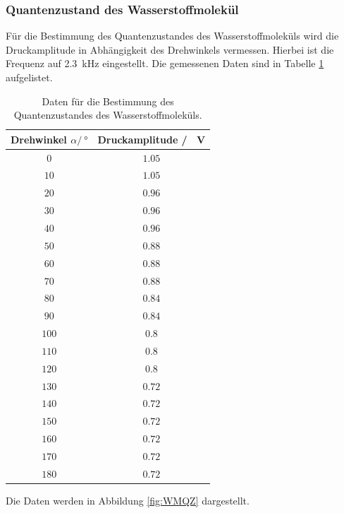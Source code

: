 \subsubsection{Quantenzustand des Wasserstoffmolekül}
Für die Bestimmung des Quantenzustandes des Wasserstoffmoleküls wird die Druckamplitude in Abhängigkeit des Drehwinkels 
vermessen. Hierbei ist die Frequenz auf \SI{2.3}{\kilo\hertz} eingestellt.
Die gemessenen Daten sind in Tabelle \ref{tab:WMQZ} aufgelistet.
\FloatBarrier
\begin{table}
    \centering
    \caption{Daten für die Bestimmung des Quantenzustandes des Wasserstoffmoleküls.}
    \label{tab:WMQZ}
    \begin{tabular}{c c}
        \toprule
        Drehwinkel $\alpha / \SI{}{\degree}$ & Druckamplitude / \SI{}{\volt}\\
        \midrule
        $\num{0}$  &$\num{1.05}$\\
        $\num{10}$ &$\num{1.05}$\\
        $\num{20}$ &$\num{0.96}$\\
        $\num{30}$ &$\num{0.96}$\\
        $\num{40}$ &$\num{0.96}$\\
        $\num{50}$ &$\num{0.88}$\\
        $\num{60}$ &$\num{0.88}$\\
        $\num{70}$ &$\num{0.88}$\\
        $\num{80}$ &$\num{0.84}$\\
        $\num{90}$ &$\num{0.84}$\\
        $\num{100}$&$\num{0.8}$\\
        $\num{110}$&$\num{0.8}$\\
        $\num{120}$&$\num{0.8}$\\
        $\num{130}$&$\num{0.72}$\\
        $\num{140}$&$\num{0.72}$\\
        $\num{150}$&$\num{0.72}$\\
        $\num{160}$&$\num{0.72}$\\
        $\num{170}$&$\num{0.72}$\\
        $\num{180}$&$\num{0.72}$\\
        \bottomrule
    \end{tabular}
\end{table}
\FloatBarrier
Die Daten werden in Abbildung \ref{fig:WMQZ} dargestellt.
\FloatBarrier
